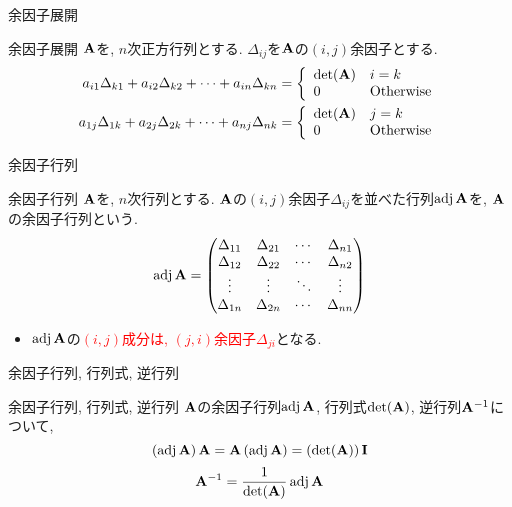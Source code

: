 \documentclass[dvipdfmx,notheorems,t]{beamer}
\begin{document}
\begin{frame}{余因子展開}
\begin{block}{余因子展開}
  $\vb{A}$を, $n$次正方行列とする.
  $\Delta_{ij}$を$\vb{A}$の$(i, j)$余因子とする.
  \begin{align*}
    a_{i1} \Delta_{k1} + a_{i2} \Delta_{k2} + \cdots + a_{in} \Delta_{kn}
      &= \left\{ \begin{array}{ll} \det(\vb{A}) & i = k \\ 0 & \text{Otherwise} \end{array} \right. \\
    a_{1j} \Delta_{1k} + a_{2j} \Delta_{2k} + \cdots + a_{nj} \Delta_{nk}
      &= \left\{ \begin{array}{ll} \det(\vb{A}) & j = k \\ 0 & \text{Otherwise} \end{array} \right.
  \end{align*}
\end{block}
\end{frame}

\begin{frame}{余因子行列}
\begin{block}{余因子行列}
  $\vb{A}$を, $n$次行列とする.
  $\vb{A}$の$(i, j)$余因子$\Delta_{ij}$を並べた行列$\operatorname{adj} \vb{A}$を, $\vb{A}$の余因子行列という.
  $$\adj \vb{A} = \mqty(\Delta_{11} & \Delta_{21} & \cdots & \Delta_{n1} \\
    \Delta_{12} & \Delta_{22} & \cdots & \Delta_{n2} \\
    \vdots & \vdots & \ddots & \vdots \\
    \Delta_{1n} & \Delta_{2n} & \cdots & \Delta_{nn})$$
\end{block}

\begin{itemize}
  \item $\operatorname{adj} \vb{A}$の\textcolor{red}{$(i, j)$成分は, $(j, i)$余因子$\Delta_{ji}$}となる.
\end{itemize}
\end{frame}

\begin{frame}{余因子行列, 行列式, 逆行列}
\begin{block}{余因子行列, 行列式, 逆行列}
  $\vb{A}$の余因子行列$\operatorname{adj} \vb{A}$, 行列式$\det(\vb{A})$, 逆行列$\vb{A}^{-1}$について,
  $$\left( \operatorname{adj} \vb{A} \right) \vb{A} = \vb{A} \left( \operatorname{adj} \vb{A} \right)
    = \left( \det(\vb{A}) \right) \vb{I}$$
  $$\vb{A}^{-1} = \frac{1}{\det(\vb{A})} \operatorname{adj} \vb{A}$$
\end{block}
\end{frame}
\end{document}
